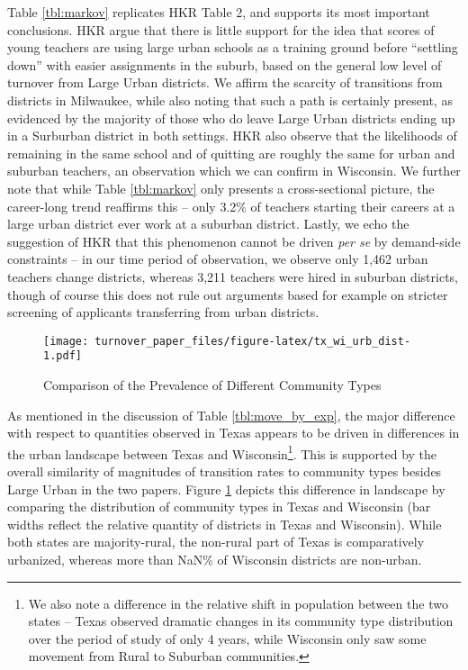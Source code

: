 \documentclass[12pt,]{article}
\let\rmarkdownfootnote\footnote%
\def\footnote{\protect\rmarkdownfootnote}
\begin{document}
Table \ref{tbl:markov} replicates HKR Table 2, and supports its most
important conclusions. HKR argue that there is little support for the
idea that scores of young teachers are using large urban schools as a
training ground before ``settling down'' with easier assignments in the
suburb, based on the general low level of turnover from Large Urban
districts. We affirm the scarcity of transitions from districts in
Milwaukee, while also noting that such a path is certainly present, as
evidenced by the majority of those who do leave Large Urban districts
ending up in a Surburban district in both settings. HKR also observe
that the likelihoods of remaining in the same school and of quitting are
roughly the same for urban and suburban teachers, an observation which
we can confirm in Wisconsin. We further note that while Table
\ref{tbl:markov} only presents a cross-sectional picture, the
career-long trend reaffirms this -- only 3.2\% of teachers starting
their careers at a large urban district ever work at a suburban
district. Lastly, we echo the suggestion of HKR that this phenomenon
cannot be driven \emph{per se} by demand-side constraints -- in our time
period of observation, we observe only 1,462 urban teachers change
districts, whereas 3,211 teachers were hired in suburban districts,
though of course this does not rule out arguments based for example on
stricter screening of applicants transferring from urban districts.

\begin{figure}[htbp]
\centering
\texttt{[image: turnover\_paper\_files/figure-latex/tx\_wi\_urb\_dist-1.pdf]}
\caption{\label{fig:ti_wi_urb}Comparison of the Prevalence of Different
Community Types}
\end{figure}

As mentioned in the discussion of Table \ref{tbl:move_by_exp}, the major
difference with respect to quantities observed in Texas appears to be
driven in differences in the urban landscape between Texas and
Wisconsin\footnote{We also note a difference in the relative shift in
  population between the two states -- Texas observed dramatic changes
  in its community type distribution over the period of study of only 4
  years, while Wisconsin only saw some movement from Rural to Suburban
  communities.}. This is supported by the overall similarity of
magnitudes of transition rates to community types besides Large Urban in
the two papers. Figure \ref{fig:ti_wi_urb} depicts this difference in
landscape by comparing the distribution of community types in Texas and
Wisconsin (bar widths reflect the relative quantity of districts in
Texas and Wisconsin). While both states are majority-rural, the
non-rural part of Texas is comparatively urbanized, whereas more than
NaN\% of Wisconsin districts are non-urban.
\end{document}
